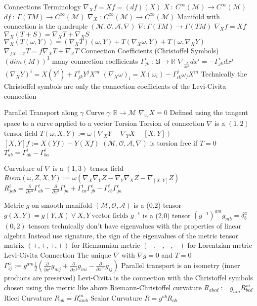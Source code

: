 \documentclass[14pt]{extarticle}
\begin{document}
\begin{outline}
		\1	Connections
			\2	Terminology
				\3	$\nabla_Xf = Xf = (df)(X)$
				\3	$X~:~C^{\infty}(\mathcal{M}) \rightarrow C^{\infty}(\mathcal{M})$
				\3	$df~:~\Gamma(TM) \rightarrow C^{\infty}(\mathcal{M})$
				\3	$\nabla_X~:~C^{\infty}(\mathcal{M}) \rightarrow C^{\infty}(\mathcal{M})$
			\2	Manifold with connection is the quadruple $(\mathcal{M},\mathcal{O},\mathcal{A},\nabla)$
				\3	$\nabla : \Gamma(TM) \rightarrow \Gamma(TM)$
				\3	$\nabla_X f = Xf$
				\3	$\nabla_X(T + S) = \nabla_XT + \nabla_XS$
				\3	$\nabla_X(T(\omega,Y)) = (\nabla_XT)(\omega,Y) + T(\nabla_X\omega,Y) + T(\omega,\nabla_XY)$
				\3	$\nabla_{fX + Z}T = f\nabla_XT + \nabla_ZT$
			\2	Connection Coefficients (Christoffel Symbols)
				\3	$(dim(M))^3$ many connection coefficients
				\3	$\Gamma^i_{jk}~:~\mathfrak{U} \rightarrow \mathbb{R}$
				\3	$\nabla_{\frac{\partial}{\partial x^k}}dx^i = -\Gamma^i_{jk}dx^j$
				\3	$(\nabla_XY)^i = X(Y^i) + \Gamma^i_{jk}Y^jX^m$
				\3	$(\nabla_X\omega)_i = X(\omega_i) - \Gamma^j_{ik}\omega_jX^m$
				\3	Technically the Christoffel symbols are only the connection coefficients of the Levi-Civita connection

		\1	Parallel Transport along $\gamma$
			\2	Curve $\gamma : \mathbb{R} \rightarrow \mathcal{M}$	
			\2	$\nabla_{v_{\gamma}}X = 0$
			\2	Defined using the tangent space to a curve applied to a vector
		\1	Torsion
			\2	Torsion of connection $\nabla$ is a $(1,2)$ tensor field
			\2	$T(\omega,X,Y) := \omega(\nabla_XY - \nabla_YX - [X,Y])$
				\3	$[X,Y]f := X(Yf) - Y(Xf)$
			\2	$(\mathcal{M},\mathcal{O},\mathcal{A},\nabla)$ is torsion free if $T = 0$
			\2	$T^i_{ab} = \Gamma^i_{ab} - \Gamma^i_{ba}$
		
		\1	Curvature of $\nabla$ is a $(1,3)$ tensor field
			\2	$Riem(\omega,Z,X,Y) := \omega(\nabla_X\nabla_YZ - \nabla_Y\nabla_XZ - \nabla_{[X,Y]}Z)$
			\2	$R^i_{jab} = \frac{\partial}{\partial x^a}\Gamma^i_{ab} - 
					\frac{\partial}{\partial x^b}\Gamma^i_{ja} + 
					\Gamma^i_{ca}\Gamma^c_{jb} - \Gamma^i_{cb}\Gamma^c_{ja}$
		
		\1	Metric $g$ on smooth manifold $(\mathcal{M},\mathcal{O},\mathcal{A})$ is a (0,2) tensor
			\2	$g(X,Y) = g(Y,X)~\forall~X,Y~\text{vector fields}$
			\2	$g^{-1}$ is a (2,0) tensor
			\2	$(g^{-1})^{am}g_{mb} = \delta^a_b$
			\2	$(0,2)$ tensors technically don't have eigenvalues with the properties of linear algebra
				\3	Instead use signature, the sign of the eigenvalues of the metric tensor matrix
				\3	$(+,+,+,+)$ for Riemannian metric	
				\3	$(+,-,-,-)$ for Lorentzian metric
			\2	Levi-Civita Connection
				\3	The unique $\nabla$ with $\nabla g = 0$ and $T = 0$
				\3	$\Gamma^a_{ij} := g^{am} \frac{1}{2}(\frac{\partial}{\partial x^i}g_{mj} +
							\frac{\partial}{\partial x^j}g_{mi} - \frac{\partial}{\partial x^m}g_{ij})$
				\3	Parallel transport is an isometry (inner products are preserved)
				\3	Levi-Civita is the connection with the Christoffel symbols chosen using the
						metric like above
			\2	Riemann-Christoffel curvature
				\3	$R_{abcd} := g_{am}R^m_{bcd}$
			\2	Ricci Curvature
				\3	$R_{ab} = R^m_{amb}$
			\2	Scalar Curvature
				\3	$R = g^{ab}R_{ab}$


\end{outline}
\end{document}
